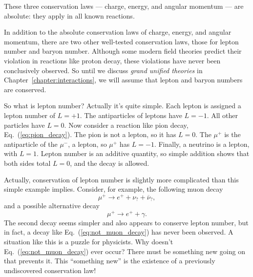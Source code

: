 
These three conservation laws --- charge, energy, and angular
momentum --- are absolute: they apply in all known reactions.

In addition to the absolute conservation laws of charge, energy, and
angular momentum, there are two other well-tested conservation laws,
those for lepton number and baryon number.  Although some modern field
theories predict their violation in reactions like proton decay, these
violations have never been conclusively observed.  So until we discuss
{\em grand unified theories} in Chapter~\ref{chapter:interactions}, we will
assume that lepton and baryon numbers are conserved.

So what is lepton number?  Actually it's quite simple.  Each lepton is
assigned a lepton number of $L = +1$.  The antiparticles of leptons
have $L = -1$.  All other particles have $L = 0$.  Now consider a
reaction like pion decay, Eq.~(\ref{eq:pion_decay}).  The pion is not
a lepton, so it has $L = 0$.  The $\mu^+$ is the antiparticle of the
$\mu^-$, a lepton, so $\mu^+$ has $L = -1$.  Finally, a neutrino is a
lepton, with $L = 1$.  Lepton number is an additive quantity, so
simple addition shows that both sides total $L = 0$, and the decay is
allowed.

Actually, conservation of lepton number is slightly more complicated
than this simple example implies.  Consider, for example, the following
muon decay
\begin{equation}
\mu^+ \to e^+ + \nu_? + \overline\nu_?,
\label{eq:muon_decay_q}
\end{equation}
 and a possible alternative decay
\begin{equation}
\mu^+ \to e^+ + \gamma.
\label{eq:not_muon_decay}
\end{equation}
The second decay seems simpler and also appears to conserve lepton
number, but in fact, a decay like Eq.~(\ref{eq:not_muon_decay}) has
never been observed.  A situation like this is a puzzle for
physicists.  Why doesn't Eq.~(\ref{eq:not_muon_decay}) ever occur?
There must be something new going on that prevents it.  This
``something new'' is the existence of a previously undiscovered
conservation law!

